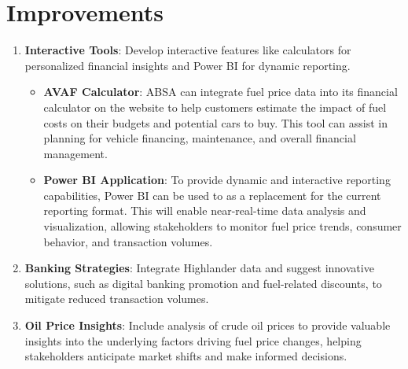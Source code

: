 \documentclass{article}
\begin{document}
	\section*{Improvements}
	\begin{enumerate}
		\item \textbf{Interactive Tools}: Develop interactive features like calculators for personalized financial insights and Power BI for dynamic reporting.
		\begin{itemize}
			\item \textbf{AVAF Calculator}: ABSA can integrate fuel price data into its financial calculator on the website to help customers estimate the impact of fuel costs on their budgets and potential cars to buy. This tool can assist in planning for vehicle financing, maintenance, and overall financial management.
			\item \textbf{Power BI Application}: To provide dynamic and interactive reporting capabilities, Power BI can be used to as a replacement for the current reporting format. This will enable near-real-time data analysis and visualization, allowing stakeholders to monitor fuel price trends, consumer behavior, and transaction volumes. %
		\end{itemize}
		
		\item \textbf{Banking Strategies}: Integrate Highlander data and suggest innovative solutions, such as digital banking promotion and fuel-related discounts, to mitigate reduced transaction volumes.
		
		\item \textbf{Oil Price Insights}: Include analysis of crude oil prices to provide valuable insights into the underlying factors driving fuel price changes, helping stakeholders anticipate market shifts and make informed decisions.
	\end{enumerate}
	
\end{document}
